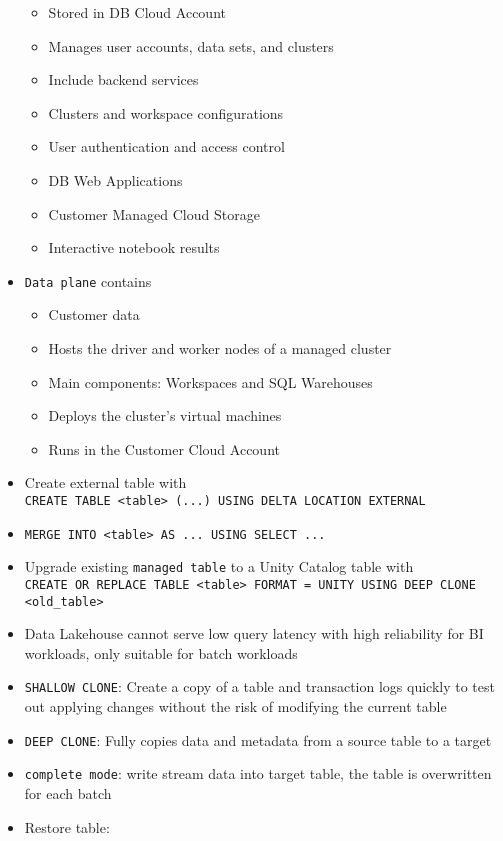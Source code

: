 \documentclass[11pt]{scrartcl}
\begin{document}
\begin{itemize}
\begin{itemize}
		\item Stored in DB Cloud Account
		\item Manages user accounts, data sets, and clusters
		\item Include backend services
		\item Clusters and workspace configurations
		\item User authentication and access control
		\item DB Web Applications
		\item Customer Managed Cloud Storage
		\item Interactive notebook results
	\end{itemize}
	\item \texttt{Data plane} contains
	\begin{itemize}
		\item Customer data
		\item Hosts the driver and worker nodes of a managed cluster
		\item Main components: Workspaces and SQL Warehouses
		\item Deploys the cluster's virtual machines
		\item Runs in the Customer Cloud Account
	\end{itemize}
	\item Create external table with \\ \texttt{CREATE TABLE <table> (...) USING DELTA LOCATION EXTERNAL}
	\item \texttt{MERGE INTO <table> AS ... USING SELECT ...}
	\item Upgrade existing \texttt{managed table} to a Unity Catalog table with \\ \texttt{CREATE OR REPLACE TABLE <table> FORMAT = UNITY USING DEEP CLONE <old\_table>}
	\item Data Lakehouse cannot serve low query latency with high reliability for BI workloads, only suitable for batch workloads
	\item \texttt{SHALLOW CLONE}: Create a copy of a table and transaction logs quickly to test out applying changes without the risk of modifying the current table
	\item \texttt{DEEP CLONE}: Fully copies data and metadata from a source table to a target
	\item \texttt{complete mode}: write stream data into target table, the table is overwritten for each batch
	\item Restore table:
	\begin{itemize}

\end{itemize}
\end{itemize}
\end{document}
